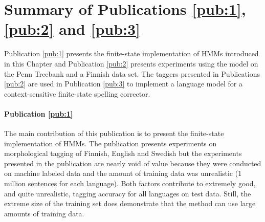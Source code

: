 

\section{Summary of Publications \ref{pub:1}, \ref{pub:2} and \ref{pub:3}}

Publication \ref{pub:1} presents the finite-state implementation of
HMMs introduced in this Chapter and Publication \ref{pub:2} presents
experiments using the model on the Penn Treebank and a Finnish data
set. The taggers presented in Publications \ref{pub:2} are used in
Publication \ref{pub:3} to implement a language model for a
context-sensitive finite-state spelling corrector.

\paragraph{Publication \ref{pub:1}} The main contribution of this
publication is to present the finite-state implementation of HMMs. The
publication presents experiments on morphological tagging of Finnish,
English and Swedish but the experiments presented in the publication
are nearly void of value because they were conducted on machine
labeled data and the amount of training data was unrealistic (1
million sentences for each language). Both factors contribute to
extremely good, and quite unrealistic, tagging accuracy for all
languages on test data. Still, the extreme size of the training set
does demonstrate that the method can use large amounts of training
data.

